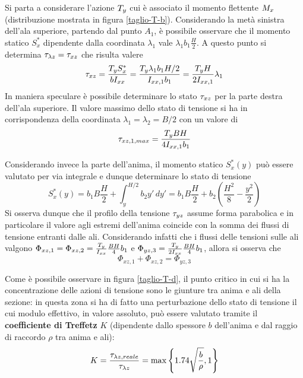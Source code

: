 		
		Si parta a considerare l'azione $T_y$ cui è associato il momento flettente $M_x$ (distribuzione mostrata in figura \ref{taglio-T-b}). Considerando la metà sinistra dell'ala superiore, partendo dal punto $A_1$, è possibile osservare che il momento statico $S_x^*$ dipendente dalla coordinata $\lambda_1$ vale $\lambda_1 b_1 \frac H 2$. A questo punto si determina $\tau_{\lambda z} = \tau_{xz}$ che risulta valere
		\[ \tau_{xz} = \frac {T_y S_x^*}{bI_{xx}} = \frac{T_y \lambda_1 b_1 H/2}{I_{xx,1}b_1} = \frac{T_y H}{2 I_{xx,1}} \lambda_1 \]
		In maniera speculare è possibile determinare lo stato $\tau_{xz}$ per la parte destra dell'ala superiore. Il valore massimo dello stato di tensione si ha in corrispondenza della coordinata $\lambda_1 = \lambda_2 = B/2$ con un valore di 
		\[ \tau_{xz,1,max} = \frac{T_y BH}{4 I_{xx,1}b_1} \]
		
		Considerando invece la parte dell'anima, il momento statico $S_x^*(y)$ può essere valutato per via integrale e dunque determinare lo stato di tensione
		\[ S_x^*(y) = b_1 B\frac H2 + \int_y^{H/2}b_2y'\, dy' = b_1 B \frac H 2 + b_2 \left(\frac{H^2}{8} - \frac{y^2}{2}\right)  \]
		Si osserva dunque che il profilo della tensione $\tau_{yz}$ assume forma parabolica e in particolare il valore agli estremi dell'anima coincide con la somma dei flussi di tensione entranti dalle ali. Considerando infatti che i flussi delle tensioni sulle ali valgono $\Phi_{xz,1} = \Phi_{xz,2} = \frac {T_y}{I_{xx}} \frac{BH}{4}b_1$ e $\Phi_{yz,3} = \frac {T_y} {2I_{xx}} \frac{BH} 4 b_1$, allora si osserva che
		\[ \Phi_{xz,1} + \Phi_{xz,2} = \Phi_{yz,3} \]
		
		Come è possibile osservare in figura \ref{taglio-T-d}, il punto critico in cui si ha la concentrazione delle azioni di tensione sono le giunture tra anima e ali della sezione: in questa zona si ha di fatto una perturbazione dello stato di tensione il cui modulo effettivo, in valore assoluto, può essere valutato tramite il \textbf{coefficiente di Treffetz} $K$ (dipendente dallo spessore $b$ dell'anima e dal raggio di raccordo $\rho$ tra anima e ali):
		\[K = \frac{\tau_{\lambda z,reale}}{\tau_{\lambda z}} = \max\left\{  1.74 \sqrt{\frac b\rho},1 \right\}  \]
		
